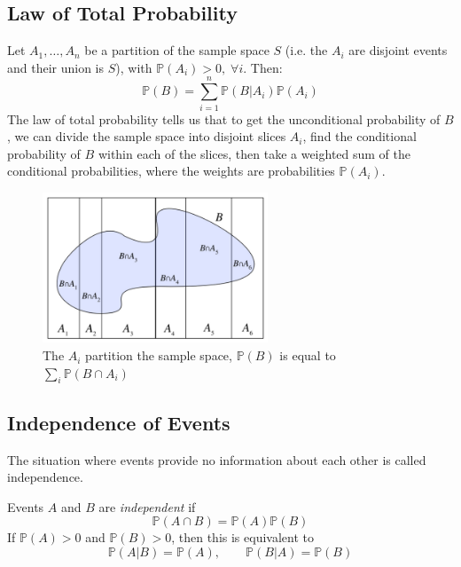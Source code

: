 \documentclass{article}
\begin{document}
\subsection{Law of Total Probability}

\begin{definition}
    Let $A_{1}, \dots , A_n$ be a partition of the sample space $S$ (i.e. the $A_i$ are disjoint events and their union is $S$), with $ \mathbb{P}(A_i) > 0, \; \forall i$. Then: \begin{equation}
        \mathbb{P}(B) = \sum_{i=1}^{n} \mathbb{P}(B|A_i)\mathbb{P}(A_i)
    \end{equation}
    The law of total probability tells us that to get the unconditional probability of $B$, we can divide the sample space into disjoint slices $A_i$, find the conditional probability of $B$ within each of the slices, then take a weighted sum of the conditional probabilities, where the weights are probabilities $ \mathbb{P}(A_i)$. 
\end{definition}

\begin{figure}[H]
    \centering
    \includegraphics[width=0.6\textwidth]{Images/lawoftotalprobability.png}
    \caption{The $A_i$ partition the sample space, $ \mathbb{P}(B)$ is equal to $ \sum_{i} \mathbb{P}(B \cap A_i)$}
    \label{fig:8-lawoftotalprob}
\end{figure} 

\subsection{Independence of Events}

The situation where events provide no information about each other is called independence. 

\begin{definition}
    Events $A$ and $B$ are \textit{independent} if \begin{equation*}
        \mathbb{P}(A \cap B) = \mathbb{P}(A) \mathbb{P}(B)
    \end{equation*} If $ \mathbb{P}(A) > 0$ and $ \mathbb{P}(B) > 0 $, then this is equivalent to \begin{equation*}
        \mathbb{P}(A | B) = \mathbb{P}(A), \qquad \mathbb{P}(B | A) = \mathbb{P}(B)
    \end{equation*}
\end{definition}
\end{document}
